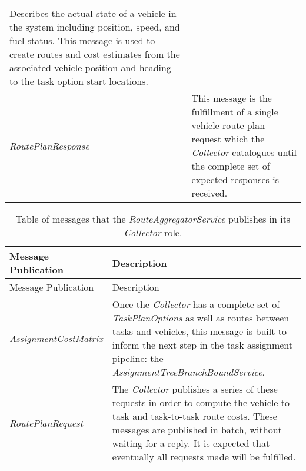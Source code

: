 \begin{longtable}[c]{@{}ll@{}}
\begin{minipage}[t]{0.65\columnwidth}
Describes the actual state of a vehicle in the system including
position, speed, and fuel status. This message is used to create routes
and cost estimates from the associated vehicle position and heading to
the task option start locations.
\strut\end{minipage}\tabularnewline
\begin{minipage}[t]{0.29\columnwidth}\raggedright\strut
\emph{RoutePlanResponse}
\strut\end{minipage} &
\begin{minipage}[t]{0.65\columnwidth}\raggedright\strut
This message is the fulfillment of a single vehicle route plan request
which the \emph{Collector} catalogues until the complete set of expected
responses is received.
\strut\end{minipage}\tabularnewline
\bottomrule
\end{longtable}

\begin{longtable}[c]{@{}ll@{}}
\caption{Table of messages that the \emph{RouteAggregatorService}
publishes in its \emph{Collector} role.}\tabularnewline
\toprule
\begin{minipage}[b]{0.29\columnwidth}\raggedright\strut
Message Publication
\strut\end{minipage} &
\begin{minipage}[b]{0.65\columnwidth}\raggedright\strut
Description
\strut\end{minipage}\tabularnewline
\midrule
\endfirsthead
\toprule
\begin{minipage}[b]{0.29\columnwidth}\raggedright\strut
Message Publication
\strut\end{minipage} &
\begin{minipage}[b]{0.65\columnwidth}\raggedright\strut
Description
\strut\end{minipage}\tabularnewline
\midrule
\endhead
\begin{minipage}[t]{0.29\columnwidth}\raggedright\strut
\emph{AssignmentCostMatrix}
\strut\end{minipage} &
\begin{minipage}[t]{0.65\columnwidth}\raggedright\strut
Once the \emph{Collector} has a complete set of \emph{TaskPlanOptions}
as well as routes between tasks and vehicles, this message is built to
inform the next step in the task assignment pipeline: the
\emph{AssignmentTreeBranchBoundService}.
\strut\end{minipage}\tabularnewline
\begin{minipage}[t]{0.29\columnwidth}\raggedright\strut
\emph{RoutePlanRequest}
\strut\end{minipage} &
\begin{minipage}[t]{0.65\columnwidth}\raggedright\strut
The \emph{Collector} publishes a series of these requests in order to
compute the vehicle-to-task and task-to-task route costs. These messages
are published in batch, without waiting for a reply. It is expected that
eventually all requests made will be fulfilled.
\strut\end{minipage}\tabularnewline
\bottomrule
\end{longtable}

